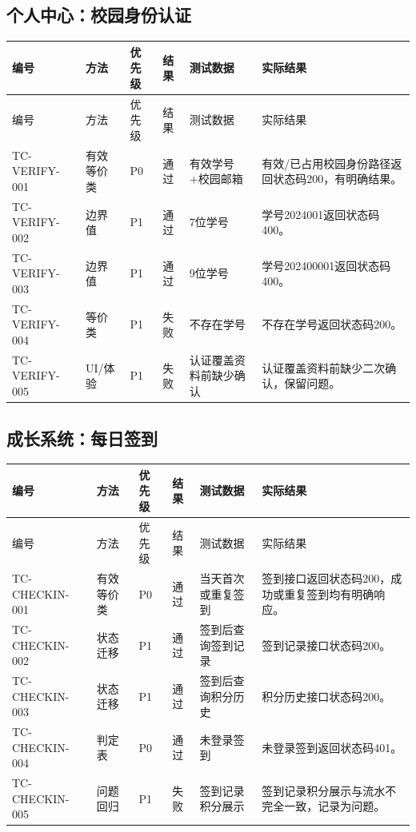 \documentclass[bwprint]{report}
\begin{document}
\subsection{个人中心：校园身份认证}
{\footnotesize
\setlength{\tabcolsep}{3pt}
\begin{longtable}{P{2.0cm}P{2.0cm}P{0.9cm}P{0.9cm}P{3.4cm}P{5.4cm}}
\toprule
编号 & 方法 & 优先级 & 结果 & 测试数据 & 实际结果\\
\midrule
\endfirsthead
\toprule
编号 & 方法 & 优先级 & 结果 & 测试数据 & 实际结果\\
\midrule
\endhead
TC-VERIFY-001 & 有效等价类 & P0 & 通过 & 有效学号+校园邮箱 & 有效/已占用校园身份路径返回状态码200，有明确结果。 \\
TC-VERIFY-002 & 边界值 & P1 & 通过 & 7位学号 & 学号2024001返回状态码400。 \\
TC-VERIFY-003 & 边界值 & P1 & 通过 & 9位学号 & 学号202400001返回状态码400。 \\
TC-VERIFY-004 & 等价类 & P1 & 失败 & 不存在学号 & 不存在学号返回状态码200。 \\
TC-VERIFY-005 & UI/体验 & P1 & 失败 & 认证覆盖资料前缺少确认 & 认证覆盖资料前缺少二次确认，保留问题。 \\
\bottomrule
\end{longtable}
}
\subsection{成长系统：每日签到}
{\footnotesize
\setlength{\tabcolsep}{3pt}
\begin{longtable}{P{2.0cm}P{2.0cm}P{0.9cm}P{0.9cm}P{3.4cm}P{5.4cm}}
\toprule
编号 & 方法 & 优先级 & 结果 & 测试数据 & 实际结果\\
\midrule
\endfirsthead
\toprule
编号 & 方法 & 优先级 & 结果 & 测试数据 & 实际结果\\
\midrule
\endhead
TC-CHECKIN-001 & 有效等价类 & P0 & 通过 & 当天首次或重复签到 & 签到接口返回状态码200，成功或重复签到均有明确响应。 \\
TC-CHECKIN-002 & 状态迁移 & P1 & 通过 & 签到后查询签到记录 & 签到记录接口状态码200。 \\
TC-CHECKIN-003 & 状态迁移 & P1 & 通过 & 签到后查询积分历史 & 积分历史接口状态码200。 \\
TC-CHECKIN-004 & 判定表 & P0 & 通过 & 未登录签到 & 未登录签到返回状态码401。 \\
TC-CHECKIN-005 & 问题回归 & P1 & 失败 & 签到记录积分展示 & 签到记录积分展示与流水不完全一致，记录为问题。 \\
\bottomrule
\end{longtable}
}
\end{document}
